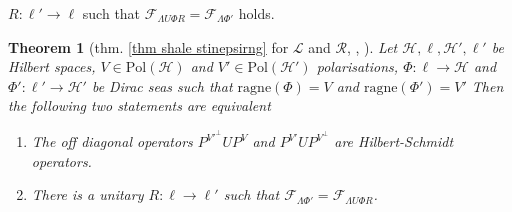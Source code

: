 \documentclass[b5paper,draft,openbib,12pt]{memoir}
\newtheorem{Thm}[Def]{Theorem}
\begin{document}
\(R:\ell'\rightarrow \ell\) such that 
\(\mathcal{F}_{\mathsf{\Lambda}U\Phi R}
=\mathcal{F}_{\mathsf{\Lambda}\Phi' }\) holds. 
\begin{Thm}[{thm. \ref{thm shale stinepsirng} for \(\mathcal{L}\) and \(\mathcal{R}\), \cite[thm. 2.26]{ivp0}, \cite[thm 3.1]{deckert2016perspective} }]\label{thm: L R shale Stinespring}
Let \(\mathcal{H}, \ell, \mathcal{H}',\ell'\) be Hilbert spaces, 
\(V\in\mathrm{Pol}(\mathcal{H})\) and \(V'\in\mathrm{Pol}(\mathcal{H}')\) 
polarisations, \(\Phi:\ell\rightarrow  \mathcal{H}\) and 
\(\Phi':\ell'\rightarrow \mathcal{H}'\) be Dirac seas 
such that \(\mathrm{ragne}(\Phi)=V\) and \(\mathrm{ragne}(\Phi')=V'\)
Then the following two statements are equivalent
\begin{enumerate}[label=\alph*)]
  \item The off diagonal operators \(P^{{V'}^\perp}U P^V\) and 
  \(P^{V'}UP^{V^\perp}\) are Hilbert-Schmidt operators.
  \item There is a unitary \(R:\ell\rightarrow \ell'\) such 
  that \(\mathcal{F}_{\mathsf{\Lambda}\Phi'}=
  \mathcal{F}_{\mathsf{\Lambda}U\Phi R}\).
\end{enumerate}
\end{Thm}
\end{document}
